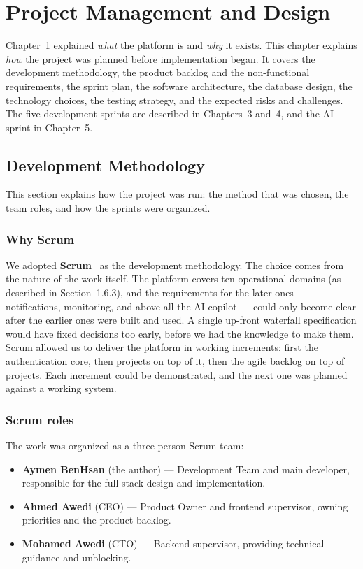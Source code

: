 \chapter{Project Management and Design}

Chapter~1 explained \emph{what} the platform is and \emph{why} it exists. This chapter explains
\emph{how} the project was planned before implementation began. It covers the development
methodology, the product backlog and the non-functional requirements, the sprint plan, the
software architecture, the database design, the technology choices, the testing strategy, and the
expected risks and challenges. The five development sprints are described in Chapters~3 and~4, and
the AI sprint in Chapter~5.

\section{Development Methodology}

This section explains how the project was run: the method that was chosen, the team roles, and
how the sprints were organized.

\subsection{Why Scrum}

We adopted \textbf{Scrum}~\cite{schwaber2020scrum} as the development methodology. The choice
comes from the nature of the work itself. The platform covers ten operational domains (as
described in Section~1.6.3), and the requirements for the later ones --- notifications,
monitoring, and above all the AI copilot --- could only become clear after the earlier ones
were built and used. A single up-front waterfall specification would have fixed decisions too
early, before we had the knowledge to make them. Scrum allowed us to deliver the platform in
working increments: first the authentication core, then projects on top of it, then the agile
backlog on top of projects. Each increment could be demonstrated, and the next one was planned
against a working system.

\subsection{Scrum roles}

The work was organized as a three-person Scrum team:

\begin{itemize}
  \item \textbf{Aymen BenHsan} (the author) --- Development Team and main developer, responsible
    for the full-stack design and implementation.
  \item \textbf{Ahmed Awedi} (CEO) --- Product Owner and frontend supervisor, owning priorities
    and the product backlog.
  \item \textbf{Mohamed Awedi} (CTO) --- Backend supervisor, providing technical guidance and
    unblocking.
\end{itemize}

